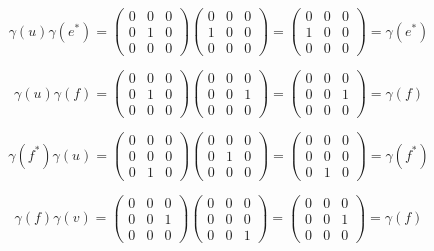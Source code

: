 \begin{solution}
    $$\gamma(u)\gamma(e^*)=
    \left(\begin{array}{ccc} 0 & 0 & 0 \\ 0 & 1 & 0 \\ 0 & 0 & 0 \end{array}\right)
    \left(\begin{array}{ccc} 0 & 0 & 0 \\ 1 & 0 & 0 \\ 0 & 0 & 0 \end{array}\right)
    =\left(\begin{array}{ccc} 0 & 0 & 0 \\ 1 & 0 & 0 \\ 0 & 0 & 0 \end{array}\right)=\gamma(e^*)$$

    $$\gamma(u)\gamma(f)=\left(\begin{array}{ccc} 0 & 0 & 0 \\ 0 & 1 & 0 \\ 0 & 0 & 0 \end{array}\right)
    \left(\begin{array}{ccc} 0 & 0 & 0 \\ 0 & 0 & 1 \\ 0 & 0 & 0 \end{array}\right)
    =\left(\begin{array}{ccc} 0 & 0 & 0 \\ 0 & 0 & 1 \\ 0 & 0 & 0 \end{array}\right)=\gamma(f)$$

    $$\gamma(f^*)\gamma(u)=
    \left(\begin{array}{ccc} 0 & 0 & 0 \\ 0 & 0 & 0 \\ 0 & 1 & 0 \end{array}\right)
    \left(\begin{array}{ccc} 0 & 0 & 0 \\ 0 & 1 & 0 \\ 0 & 0 & 0 \end{array}\right)
    =\left(\begin{array}{ccc} 0 & 0 & 0 \\ 0 & 0 & 0 \\ 0 & 1 & 0 \end{array}\right)=\gamma(f^*)$$

    $$\gamma(f)\gamma(v)=\left(\begin{array}{ccc} 0 & 0 & 0 \\ 0 & 0 & 1 \\ 0 & 0 & 0 \end{array}\right)
    \left(\begin{array}{ccc} 0 & 0 & 0 \\ 0 & 0 & 0 \\ 0 & 0 & 1 \end{array}\right)
    =\left(\begin{array}{ccc} 0 & 0 & 0 \\ 0 & 0 & 1 \\ 0 & 0 & 0 \end{array}\right)=\gamma(f)$$


\end{solution}
